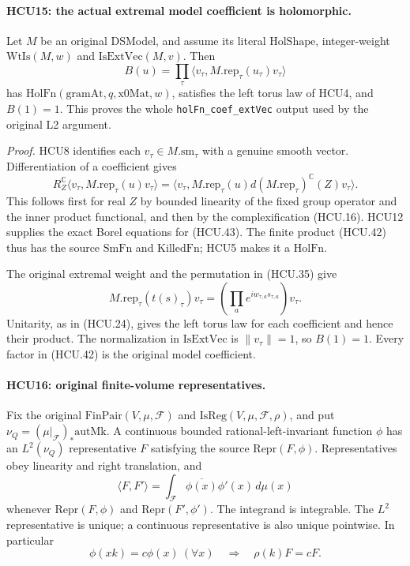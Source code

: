 \paragraph{HCU15: the actual extremal model coefficient is holomorphic.}
\label{claim:HCU15}
Let \(M\) be an original DSModel, and assume its literal
\(\mathrm{HolShape}\), integer-weight \(\mathrm{WtIs}(M,w)\)
and \(\mathrm{IsExtVec}(M,v)\).
Then
\[
 B(u)=\prod_\tau
 \langle v_\tau,M.\mathrm{rep}_\tau(u_\tau)v_\tau\rangle
 \tag{HCU.42}
\]
has \(\mathrm{HolFn}(\mathrm{gramAt},q,\mathrm{x0Mat},w)\),
satisfies the left torus law of HCU4, and \(B(1)=1\).
This proves the whole \texttt{holFn\_coef\_extVec} output used
by the original L2 argument.

\emph{Proof.}
HCU8 identifies each \(v_\tau\in M.\mathrm{sm}_\tau\) with a genuine
smooth vector.  Differentiation of a coefficient gives
\[
 R_Z^{\mathbb C}
   \langle v_\tau,M.\mathrm{rep}_\tau(u)v_\tau\rangle
 =\langle v_\tau,M.\mathrm{rep}_\tau(u)
                 d(M.\mathrm{rep}_\tau)^{\mathbb C}(Z)v_\tau\rangle.
 \tag{HCU.43}
\]
This follows first for real \(Z\) by bounded linearity of the
fixed group operator and the inner product functional, and then
by the complexification (HCU.16).
HCU12 supplies the exact Borel equations for (HCU.43).
The finite product (HCU.42) thus has the source \(\mathrm{SmFn}\)
and \(\mathrm{KilledFn}\); HCU5 makes it a \(\mathrm{HolFn}\).

The original extremal weight and the permutation in (HCU.35) give
\[
 M.\mathrm{rep}_\tau(t(s)_\tau)v_\tau
 =\left(\prod_a e^{iw_{\tau,a}s_{\tau,a}}\right)v_\tau.
\]
Unitarity, as in (HCU.24), gives the left torus law for each
coefficient and hence their product.  The normalization in
\(\mathrm{IsExtVec}\) is \(\|v_\tau\|=1\), so \(B(1)=1\).
Every factor in (HCU.42) is the original model coefficient.

\paragraph{HCU16: original finite-volume representatives.}
\label{claim:HCU16}
Fix the original \(\mathrm{FinPair}(V,\mu,\mathcal F)\) and
\(\mathrm{IsReg}(V,\mu,\mathcal F,\rho)\), and put
\(\nu_Q=(\mu|_{\mathcal F})_*\mathrm{autMk}\).
A continuous bounded rational-left-invariant function \(\phi\)
has an \(L^2(\nu_Q)\) representative \(F\) satisfying the source
\(\mathrm{Repr}(F,\phi)\).
Representatives obey linearity and right translation, and
\[
 \langle F,F'\rangle
   =\int_{\mathcal F}\overline{\phi(x)}\phi'(x)\,d\mu(x)
 \tag{HCU.44}
\]
whenever \(\mathrm{Repr}(F,\phi)\) and
\(\mathrm{Repr}(F',\phi')\).
The integrand is integrable.  The \(L^2\) representative is unique;
a continuous representative is also unique pointwise.
In particular
\[
 \phi(xk)=c\phi(x)\ (\forall x)
 \quad\Longrightarrow\quad \rho(k)F=cF .
 \tag{HCU.45}
\]


